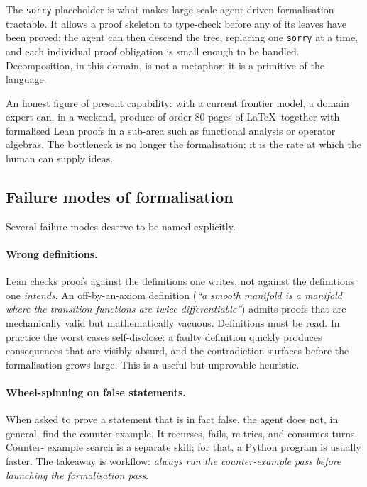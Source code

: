 \begin{intuition}
  The \texttt{sorry} placeholder is what makes large-scale
  agent-driven formalisation tractable.  It allows a proof
  skeleton to type-check before any of its leaves have been
  proved; the agent can then descend the tree, replacing
  one \texttt{sorry} at a time, and each individual proof
  obligation is small enough to be handled.  Decomposition,
  in this domain, is not a metaphor: it is a primitive of
  the language.
\end{intuition}

\begin{keyresult}\label{kr:80-pages}
  An honest figure of present capability: with a current
  frontier model, a domain expert can, in a weekend,
  produce of order $80$ pages of \LaTeX\ together with
  formalised Lean proofs in a sub-area such as functional
  analysis or operator algebras.  The bottleneck is no
  longer the formalisation; it is the rate at which the
  human can supply ideas.
\end{keyresult}

\subsection{Failure modes of formalisation}\label{sec:formalisation-failures}

Several failure modes deserve to be named explicitly.

\paragraph{Wrong definitions.}
Lean checks proofs against the definitions one writes, not
against the definitions one \emph{intends}.  An off-by-an-axiom
definition (\emph{``a smooth manifold is a manifold where
the transition functions are twice differentiable''})
admits proofs that are mechanically valid but
mathematically vacuous.  Definitions must be read.  In
practice the worst cases self-disclose: a faulty definition
quickly produces consequences that are visibly absurd, and
the contradiction surfaces before the formalisation grows
large.  This is a useful but unprovable heuristic.

\paragraph{Wheel-spinning on false statements.}
When asked to prove a statement that is in fact false, the
agent does not, in general, find the counter-example.  It
recurses, fails, re-tries, and consumes turns.  Counter-
example search is a separate skill; for that, a Python
program is usually faster.  The takeaway is workflow:
\emph{always run the counter-example pass before launching
the formalisation pass}.

